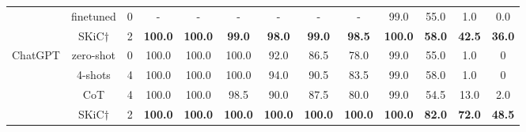 \begin{table}[t]
{\begin{tabular}{c|c|c|cc|cccc||cc|cc}
                             & finetuned &0 &- &- &- & - &- & -& 99.0 &55.0 & 1.0  &0.0 \\ 
                           & SKiC$\dag$  &2   & \textbf{100.0}                   & \textbf{100.0}                   & \textbf{99.0}  & \textbf{98.0}  & \textbf{99.0}  & \textbf{98.5}   & \textbf{100.0}                   & \textbf{58.0}                    & \textbf{42.5}                    & \textbf{36.0}                    \\  \midrule
\multirow{4}{*}{ChatGPT}   & zero-shot  &0                & 100.0                            & 100.0                            & 100.0          & 92.0           & 86.5           & 78.0           & 99.0                            & 55.0                            & 1.0                             & 0                              \\
                           & 4-shots   &4             & 100.0                            & 100.0                            & 100.0          & 94.0           & 90.5           & 83.5           & 99.0                             & 58.0                             & 1.0                              & 0                              \\
                           & CoT     &4              & 100.0                            & 100.0                            & 98.5           & 90.0           & 87.5           & 80.0           & 99.0                             & 54.5                             & 13.0                              & 2.0                              \\
                           & SKiC$\dag$ &2      & \textbf{100.0}                   & \textbf{100.0}                   & \textbf{100.0} & \textbf{100.0} & \textbf{100.0} & \textbf{100.0} & \textbf{100.0}                   & \textbf{82.0}                    & \textbf{72.0}                    & \textbf{48.5}                    \\ \bottomrule
\end{tabular} 
}
\end{table}






